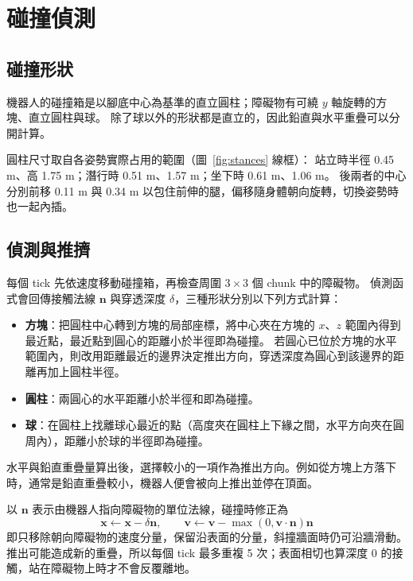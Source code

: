 \section{碰撞偵測}
\label{sec:collision}

\subsection{碰撞形狀}

機器人的碰撞箱是以腳底中心為基準的直立圓柱；障礙物有可繞 $y$ 軸旋轉的方塊、直立圓柱與球。
除了球以外的形狀都是直立的，因此鉛直與水平重疊可以分開計算。

圓柱尺寸取自各姿勢實際占用的範圍（圖~\ref{fig:stances} 線框）：
站立時半徑 0.45 m、高 1.75 m；潛行時 0.51 m、1.57 m；坐下時 0.61 m、1.06 m。
後兩者的中心分別前移 0.11 m 與 0.34 m 以包住前伸的腿，偏移隨身體朝向旋轉，切換姿勢時也一起內插。

\subsection{偵測與推擠}

每個 tick 先依速度移動碰撞箱，再檢查周圍 $3\times3$ 個 chunk 中的障礙物。
偵測函式會回傳接觸法線 $\mathbf{n}$ 與穿透深度 $\delta$，三種形狀分別以下列方式計算：
\begin{itemize}[nosep]
    \item \textbf{方塊}：把圓柱中心轉到方塊的局部座標，將中心夾在方塊的 $x$、$z$ 範圍內得到最近點，最近點到圓心的距離小於半徑即為碰撞。
          若圓心已位於方塊的水平範圍內，則改用距離最近的邊界決定推出方向，穿透深度為圓心到該邊界的距離再加上圓柱半徑。
    \item \textbf{圓柱}：兩圓心的水平距離小於半徑和即為碰撞。
    \item \textbf{球}：在圓柱上找離球心最近的點（高度夾在圓柱上下緣之間，水平方向夾在圓周內），距離小於球的半徑即為碰撞。
\end{itemize}
水平與鉛直重疊量算出後，選擇較小的一項作為推出方向。例如從方塊上方落下時，通常是鉛直重疊較小，機器人便會被向上推出並停在頂面。

以 $\mathbf{n}$ 表示由機器人指向障礙物的單位法線，碰撞時修正為
$$
    \mathbf{x} \leftarrow \mathbf{x}-\delta\mathbf{n}, \qquad
    \mathbf{v} \leftarrow \mathbf{v}-\max(0,\mathbf{v}\cdot\mathbf{n})\mathbf{n}
$$
即只移除朝向障礙物的速度分量，保留沿表面的分量，斜撞牆面時仍可沿牆滑動。
推出可能造成新的重疊，所以每個 tick 最多重複 5 次；表面相切也算深度 0 的接觸，站在障礙物上時才不會反覆離地。

